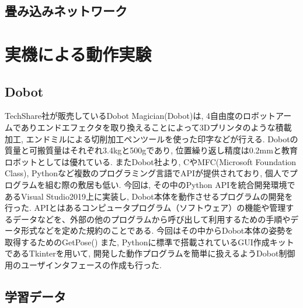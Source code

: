 \documentclass{suribt}
\begin{document}
\section{畳み込みネットワーク}



\chapter{実機による動作実験}

\section{Dobot}
TechShare社が販売しているDobot Magician(Dobot)は, 4自由度のロボットアームでありエンドエフェクタを取り換えることによって3Dプリンタのような積載加工, エンドミルによる切削加工ペンツールを使った印字などが行える. 
Dobotの質量と可搬質量はそれぞれ3.4kgと500gであり, 位置繰り返し精度は0.2mmと教育ロボットとしては優れている. 
またDobot社より, CやMFC(Microsoft Foundation Class), Pythonなど複数のプログラミング言語でAPIが提供されており, 個人でプログラムを組む際の敷居も低い. 
今回は, その中のPython APIを統合開発環境であるVisual Studio2019上に実装し, Dobot本体を動作させるプログラムの開発を行った. APIとはあるコンピュータプログラム（ソフトウェア）の機能や管理するデータなどを、外部の他のプログラムから呼び出して利用するための手順やデータ形式などを定めた規約のことである. 
今回はその中からDobot本体の姿勢を取得するためのGetPose()
また, Pythonに標準で搭載されているGUI作成キットであるTkinterを用いて, 開発した動作プログラムを簡単に扱えるようDobot制御用のユーザインタフェースの作成も行った. 

\section{学習データ}
\end{document}
